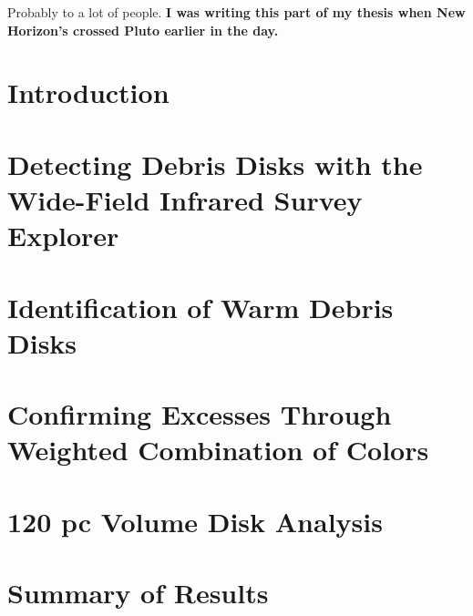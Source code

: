 \documentclass[phd,bottom,nosig]{usbthesis}
\begin{document}
\begin{dedication}
   Probably to a lot of people. \textbf{I was writing this part of my thesis when New Horizon's crossed Pluto earlier in the day.}
\end{dedication}

\tableofcontents %
\listoffigures %
\listoftables %

\begin{acknowledgements}

\end{acknowledgements}

\pagestyle{thesis}



\newpage
{}

\chapter{Introduction} \label{chap:intro}


\chapter{Detecting Debris Disks with the Wide-Field Infrared Survey Explorer}\label{chap:wise_method}


\chapter{Identification of Warm Debris Disks} \label{chap:iddisks}

\clearpage
%


\chapter{Confirming Excesses Through Weighted Combination of Colors}\label{chap:confirm}


\chapter{120 pc Volume Disk Analysis}\label{chap:120pc}


\chapter{Summary of Results}\label{chap:summary}

\end{document}
